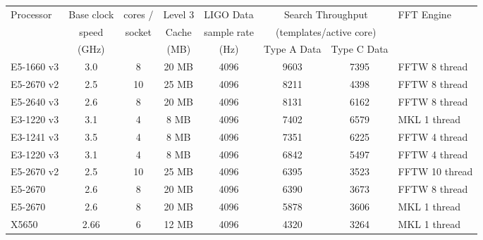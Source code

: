 \begin{table}[!t]
\begin{center}
{\small
\begin{tabular}{|l|c|c|c|c|c|c|l|}
\hline
Processor   & Base clock  & cores /    & Level 3  & LIGO Data  & \multicolumn{2}{c|}{Search Throughput} & FFT Engine \\
            & speed       & socket     & Cache    & sample rate          &  \multicolumn{2}{c|}{(templates/active core)}&            \\
            & (GHz)       &            & (MB)     &  (Hz)                  &   Type A Data  & Type C Data  &            \\
\hline

E5-1660 v3  & 3.0 & 8          & 20 MB         & 4096          &  9603 &  7395 & FFTW 8 thread      \\
E5-2670 v2  & 2.5 & 10         & 25 MB         & 4096          &  8211 &  4398 & FFTW 8 thread     \\
E5-2640 v3  & 2.6 & 8          & 20 MB         & 4096          &  8131 &  6162 & FFTW 8 thread      \\
E3-1220 v3  & 3.1 & 4          & 8 MB          & 4096          &  7402 &  6579 & MKL 1 thread       \\
E3-1241 v3  & 3.5 & 4          & 8 MB          & 4096          &  7351 &  6225 & FFTW 4 thread      \\
E3-1220 v3  & 3.1 & 4          & 8 MB          & 4096          &  6842 &  5497 & FFTW 4 thread      \\
E5-2670 v2  & 2.5 & 10         & 25 MB         & 4096          &  6395 &  3523 & FFTW 10 thread     \\
E5-2670     & 2.6 & 8          & 20 MB         & 4096          &  6390 &  3673 & FFTW 8 thread      \\
E5-2670     & 2.6 & 8          & 20 MB         & 4096          &  5878 &  3606 & MKL 1 thread       \\
X5650       & 2.66 & 6         & 12 MB         & 4096          &  4320 &  3264 & MKL 1 thread       \\\hline\hline


\end{tabular}}
\end{center}
\end{table}
